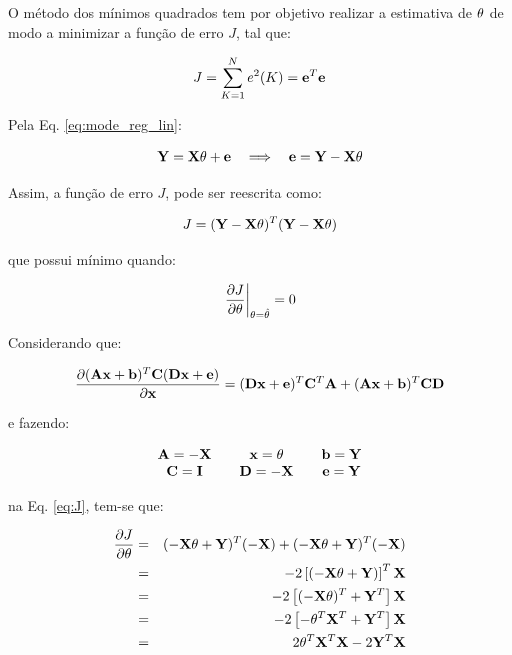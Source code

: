 O método dos mínimos quadrados tem por objetivo realizar a estimativa de
$\mathbf{\theta}$ de modo a minimizar a função de erro $J$, tal que:

\begin{equation}
J = \sum_{K = 1}^N e^2(K) = \mathbf{e}^T\mathbf{e}
\end{equation}

Pela Eq. \ref{eq:mode_reg_lin}:

\begin{equation}
\mathbf{Y} = \mathbf{X\theta} + \mathbf{e} \quad\Longrightarrow\quad \mathbf{e} = \mathbf{Y} - \mathbf{X\theta}
\end{equation}

Assim, a função de erro $J$, pode ser reescrita como:

\begin{equation}\label{eq:J}
J = (\mathbf{Y} - \mathbf{X\theta})^T(\mathbf{Y} - \mathbf{X\theta})
\end{equation}

\noindent que possui mínimo quando:

\begin{equation*}
\left.\frac{\partial J}{\partial \theta}\right|_{\theta = \hat{\mathbf{\theta}}} = 0
\end{equation*}

Considerando que:

\begin{equation*}
\frac{\partial (\mathbf{Ax} + \mathbf{b})^T\mathbf{C}(\mathbf{Dx} + \mathbf{e})}{\partial \mathbf{x}} =
(\mathbf{Dx} + \mathbf{e})^T\mathbf{C}^T\mathbf{A} + (\mathbf{Ax} + \mathbf{b})^T\mathbf{CD}
\end{equation*}

\noindent e fazendo:

\begin{equation*}
\begin{array}{c@{\qquad}c@{\qquad}c}
\mb{A} = -\mb{X} & \mb{x} = \mb{\theta} & \mb{b} = \mb{Y}\\
\mb{C} = \mb{I}  & \mb{D} = -\mb{X}     & \mb{e} = \mb{Y}
\end{array}
\end{equation*}

\noindent na Eq. \ref{eq:J}, tem-se que:

\begin{eqnarray}
\frac{\partial J}{\partial \mathbf{\theta}} & = & 
(-\mathbf{X\theta}+\mathbf{Y})^T(-\mathbf{X}) + (-\mathbf{X\theta}+\mathbf{Y})^T(-\mathbf{X})\nonumber\\
& = & -2 \left[(-\mathbf{X\theta}+\mathbf{Y})\right]^T\mathbf{X}\nonumber\\
& = & -2 \left[(-\mathbf{X\theta})^T + \mathbf{Y}^T\right]\mathbf{X}\nonumber\\
& = & -2 \left[-\mathbf{\theta}^T\mathbf{X}^T + \mathbf{Y}^T\right]\mathbf{X}\nonumber\\
& = & 2 \mathbf{\theta}^T\mathbf{X}^T\mathbf{X} -2 \mathbf{Y}^T\mathbf{X}\label{eq:deduc}
\end{eqnarray}

